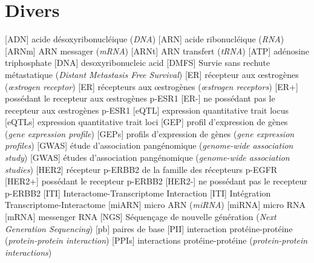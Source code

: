 	\section{\textcolor{mygrey}{Divers}}
		\begin{acronym}[CDKN2A]
			   {acide désoxyribonucléique (\emph{\acs{DNA}})}
			   {acide ribonucléique (\emph{\acs{RNA}})}
			  {\acs{ARN} messager (\emph{\acs{mRNA}})}
			  {\acs{ARN} transfert (\emph{\acs{tRNA}})}
			   {adénosine triphosphate}
			   {desoxyribonucleic acid}
			  {Survie sans rechute métastatique (\emph{Distant Metastasis Free Survival})}
			    {récepteur aux {\oe}strogènes (\emph{{\oe}strogen receptor})}
			    {récepteurs aux {\oe}strogènes (\emph{{\oe}strogen receptors})}
			   {possédant le recepteur aux {\oe}strogènes \acs{p-ESR1}}
			   {ne possédant pas le recepteur aux {\oe}strogènes \acs{p-ESR1}}
			  {expression quantitative trait locus}
			 {expression quantitative trait loci}
			   {profil d'expression de gènes (\emph{gene expression profile})}
			  {profils d'expression de gènes (\emph{gene expression profiles})}
			  {étude d'association pangénomique (\emph{genome-wide association study})}
			  {études d'association pangénomique (\emph{genome-wide association studies})}
			  {récepteur \acs{p-ERBB2} de la famille des récepteurs \acs{p-EGFR}}
			 {possédant le recepteur \acs{p-ERBB2}}
			 {ne possédant pas le recepteur \acs{p-ERBB2}}
			   {Interactome-Transcriptome Interaction}
			   {Intégration Transcriptome-Interactome}
			 {micro \acs{ARN} (\emph{\ac{miRNA}})}
			 {micro \acs{RNA}}
			  {messenger \ac{RNA}}
			   {Séquençage de nouvelle génération (\emph{Next Generation Sequencing})}
			    {paires de base}
			   {interaction protéine-protéine (\emph{protein-protein interaction})}
			  {interactions protéine-protéine (\emph{protein-protein interactions})}

\end{acronym}
